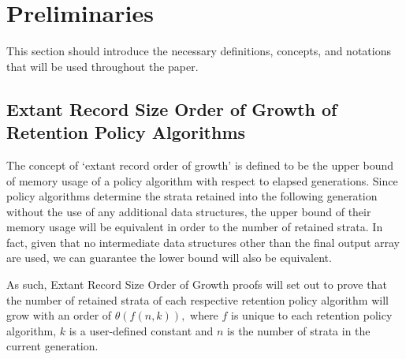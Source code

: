 \section{Preliminaries} \label{sec:methods}
This section should introduce the necessary definitions, concepts, and notations that will be used throughout the paper.

\printunsrtglossary
\subsection{Extant Record Size Order of Growth of Retention Policy Algorithms} \label{subsec:extant_record_oog}
The concept of `extant record order of growth' is defined to be the upper bound of memory usage of a policy algorithm with respect to elapsed generations.
Since policy algorithms determine the strata retained into the following generation without the use of any additional data structures, the upper bound of their memory usage will be equivalent in order to the number of retained strata.
In fact, given that no intermediate data structures other than the final output array are used, we can guarantee the lower bound will also be equivalent.

As such, Extant Record Size Order of Growth proofs will set out to prove that the number of retained strata of each respective retention policy algorithm will grow with an order of $\theta(f(n, k)),$ where $f$ is unique to each retention policy algorithm, $k$ is a user-defined constant and $n$ is the number of strata in the current generation.
